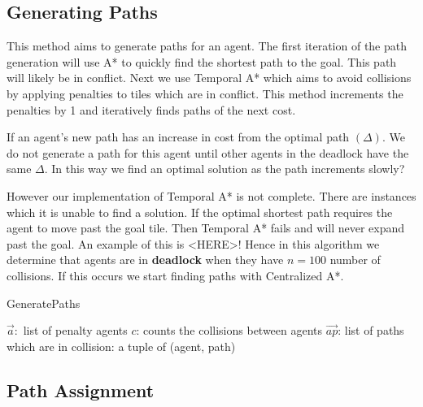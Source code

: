 \documentclass[a4paper,11pt]{article}
\begin{document}
\subsection{Generating Paths}
This method aims to generate paths for an agent. The first iteration of the path generation will use A* to quickly find the shortest path to the goal. This path will likely be in conflict. Next we use Temporal A* which aims to avoid collisions by applying penalties to tiles which are in conflict. This method increments the penalties by 1 and iteratively finds paths of the next cost. 

If an agent's new path has an increase in cost from the optimal path $(\Delta)$. We do not generate a path for this agent until other agents in the deadlock have the same $\Delta$. In this way we find an optimal solution as the path increments slowly?

However our implementation of Temporal A* is not complete. There are instances which it is unable to find a solution. If the optimal shortest path requires the agent to move past the goal tile. Then Temporal A* fails and will never expand past the goal. An example of this is <HERE>! Hence in this algorithm we determine that agents are in \textbf{deadlock} when they have $n=100$ number of collisions. If this occurs we start finding paths with Centralized A*. 

\begin{algorithm}[H]
	\caption{GeneratePaths}\label{alg_GeneratePaths}
	\begin{algorithmic}[1]
		\Require $\vec{a}:$ list of penalty agents $c$: counts the collisions between agents
		\Ensure $\vec{ap}$: list of paths which are in collision: a tuple of (agent, path)
			\Else
			\EndIf
		\EndFor
	\end{algorithmic}
\end{algorithm}

\subsection{Path Assignment}
\end{document}
